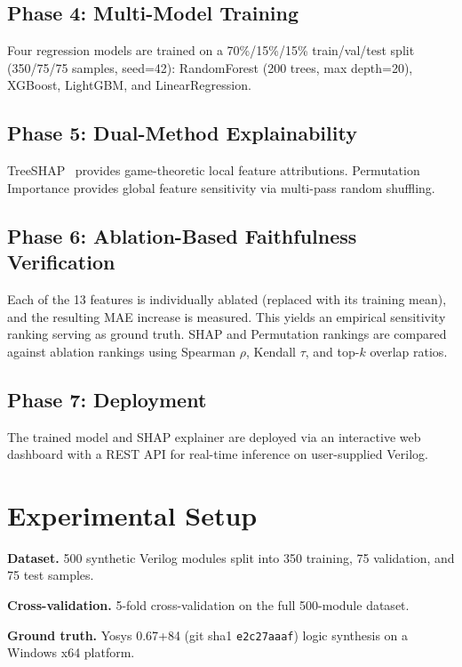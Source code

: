 \documentclass[conference]{IEEEtran}
\begin{document}
\subsection{Phase 4: Multi-Model Training}
Four regression models are trained on a 70\%/15\%/15\% train/val/test split
(350/75/75 samples, seed=42): RandomForest (200 trees, max depth=20),
XGBoost, LightGBM, and LinearRegression.

\subsection{Phase 5: Dual-Method Explainability}
TreeSHAP~\cite{lundberg2017shap} provides game-theoretic local feature
attributions. Permutation Importance provides global feature sensitivity
via multi-pass random shuffling.

\subsection{Phase 6: Ablation-Based Faithfulness Verification}
Each of the 13 features is individually ablated (replaced with its training
mean), and the resulting MAE increase is measured. This yields an empirical
sensitivity ranking serving as ground truth. SHAP and Permutation rankings
are compared against ablation rankings using Spearman $\rho$, Kendall $\tau$,
and top-$k$ overlap ratios.

\subsection{Phase 7: Deployment}
The trained model and SHAP explainer are deployed via an interactive web
dashboard with a REST API for real-time inference on user-supplied Verilog.

\section{Experimental Setup}

\textbf{Dataset.} 500 synthetic Verilog modules split into 350 training, 75
validation, and 75 test samples.

\textbf{Cross-validation.} 5-fold cross-validation on the full 500-module
dataset.

\textbf{Ground truth.} Yosys 0.67+84 (git sha1 \texttt{e2c27aaaf}) logic
synthesis on a Windows x64 platform.
\end{document}
